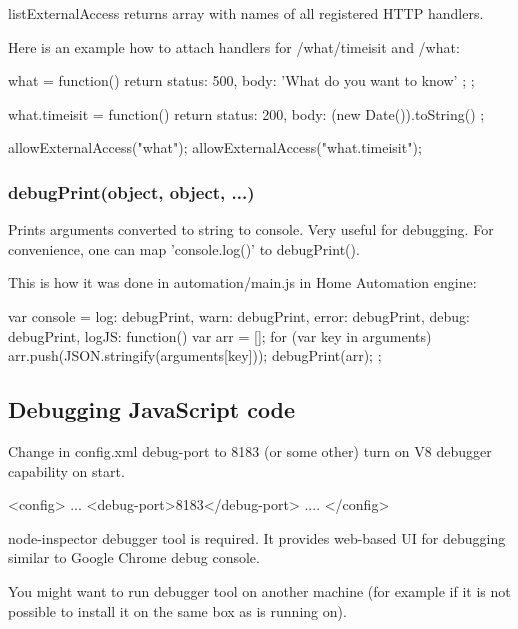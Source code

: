 listExternalAccess returns array with names of all registered HTTP handlers.

Here is an example how to attach handlers for /what/timeisit and /what:

\begin{listingverbatim}
what = function() {
  return { status: 500, body: 'What do you want to know' };
};

what.timeisit = function() {
  return { status: 200, body: (new Date()).toString() }
};

allowExternalAccess("what");
allowExternalAccess("what.timeisit");
\end{listingverbatim}

\subsubsection{debugPrint(object, object, ...)}

Prints arguments converted to string to \zway console. Very useful for debugging.
For convenience, one can map 'console.log()' to debugPrint().

This is how it was done in automation/main.js in \zway Home Automation engine:
\begin{listingverbatim}
var console = {
    log: debugPrint,
    warn: debugPrint,
    error: debugPrint,
    debug: debugPrint,
    logJS: function() {
        var arr = [];
        for (var key in arguments)
            arr.push(JSON.stringify(arguments[key]));
        debugPrint(arr);
    }
};
\end{listingverbatim}

\subsection{Debugging JavaScript code}
Change in config.xml debug-port to 8183 (or some other) turn on V8 debugger capability on \zway start.

\begin{listingverbatim}
<config>
    ...
    <debug-port>8183</debug-port>
    ....
</config>
\end{listingverbatim}

node-inspector debugger tool is required. It provides web-based UI for debugging similar 
to Google Chrome debug console.

You might want to run debugger tool on another machine (for example if it is not possible to 
install it on the same box as \zway is running on).

